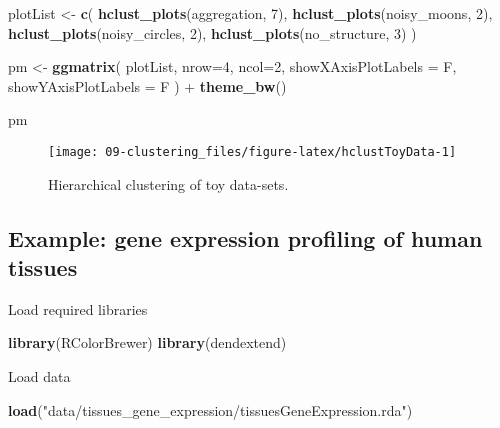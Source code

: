 \documentclass[]{book}
\newenvironment{Shaded}{\begin{snugshade}}{\end{snugshade}}
\newcommand{\KeywordTok}[1]{\textcolor[rgb]{0.13,0.29,0.53}{\textbf{{#1}}}}
\newcommand{\DataTypeTok}[1]{\textcolor[rgb]{0.13,0.29,0.53}{{#1}}}
\newcommand{\DecValTok}[1]{\textcolor[rgb]{0.00,0.00,0.81}{{#1}}}
\newcommand{\StringTok}[1]{\textcolor[rgb]{0.31,0.60,0.02}{{#1}}}
\newcommand{\NormalTok}[1]{{#1}}
\theoremstyle{definition}
\theoremstyle{definition}
\theoremstyle{definition}
\theoremstyle{remark}
\begin{document}
\begin{Shaded}
\begin{Highlighting}[]
\NormalTok{plotList <-}\StringTok{ }\KeywordTok{c}\NormalTok{(}
  \KeywordTok{hclust_plots}\NormalTok{(aggregation, }\DecValTok{7}\NormalTok{),}
  \KeywordTok{hclust_plots}\NormalTok{(noisy_moons, }\DecValTok{2}\NormalTok{),}
  \KeywordTok{hclust_plots}\NormalTok{(noisy_circles, }\DecValTok{2}\NormalTok{),}
  \KeywordTok{hclust_plots}\NormalTok{(no_structure, }\DecValTok{3}\NormalTok{)}
\NormalTok{)}

\NormalTok{pm <-}\StringTok{ }\KeywordTok{ggmatrix}\NormalTok{(}
  \NormalTok{plotList, }\DataTypeTok{nrow=}\DecValTok{4}\NormalTok{, }\DataTypeTok{ncol=}\DecValTok{2}\NormalTok{, }\DataTypeTok{showXAxisPlotLabels =} \NormalTok{F, }\DataTypeTok{showYAxisPlotLabels =} \NormalTok{F}
\NormalTok{) +}\StringTok{ }\KeywordTok{theme_bw}\NormalTok{()}

\NormalTok{pm}
\end{Highlighting}
\end{Shaded}

\begin{figure}

{\centering \texttt{[image: 09-clustering\_files/figure-latex/hclustToyData-1]} 

}

\caption{Hierarchical clustering of toy data-sets. }\label{fig:hclustToyData}
\end{figure}

\subsection{Example: gene expression profiling of human
tissues}\label{example-gene-expression-profiling-of-human-tissues}

Load required libraries

\begin{Shaded}
\begin{Highlighting}[]
\KeywordTok{library}\NormalTok{(RColorBrewer)}
\KeywordTok{library}\NormalTok{(dendextend)}
\end{Highlighting}
\end{Shaded}

Load data

\begin{Shaded}
\begin{Highlighting}[]
\KeywordTok{load}\NormalTok{(}\StringTok{"data/tissues_gene_expression/tissuesGeneExpression.rda"}\NormalTok{)}
\end{Highlighting}
\end{Shaded}
\end{document}

